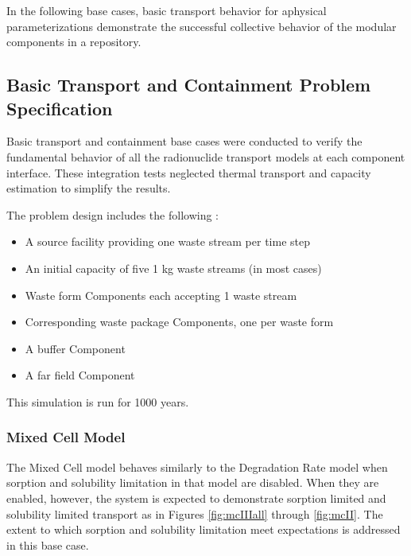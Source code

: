 In the following base cases, basic transport behavior for aphysical 
parameterizations demonstrate the successful collective behavior of the modular 
components in a \Cyder repository.

\subsection{Basic Transport and Containment Problem Specification}

Basic transport and containment base cases were conducted to verify the 
fundamental behavior of all the radionuclide transport models at each component 
interface. These integration tests neglected thermal transport and capacity 
estimation to simplify the results.

The problem design includes the following : 
\begin{itemize}
\item{A source facility providing one waste stream per time step}
\item{An initial capacity of five 1 kg waste streams (in most cases)}
\item{Waste form Components each accepting 1 waste stream} 
\item{Corresponding waste package Components, one per waste form}
\item{A buffer Component}
\item{A far field Component}
\end{itemize}

This simulation is run for 1000 years.

\subsubsection{Mixed Cell Model}
The Mixed Cell model behaves similarly to the Degradation Rate model when 
sorption and solubility limitation in that model are disabled. When they are 
enabled, however, the system is expected to demonstrate sorption limited and 
solubility limited transport as in Figures \ref{fig:mcIIIall} through 
\ref{fig:mcII}. The extent to which sorption and solubility limitation meet 
expectations is addressed in this base case.

